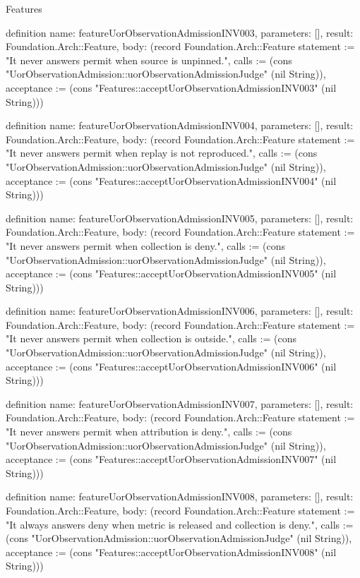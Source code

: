 \begin{lexlean}{Features}
\begin{semanticmodule}
definition{
  name: featureUorObservationAdmissionINV003,
  parameters: [],
  result: Foundation.Arch::Feature,
  body: (record Foundation.Arch::Feature {statement := "It never answers permit when source is unpinned.", calls := (cons "UorObservationAdmission::uorObservationAdmissionJudge" (nil String)), acceptance := (cons "Features::acceptUorObservationAdmissionINV003" (nil String))})
}

definition{
  name: featureUorObservationAdmissionINV004,
  parameters: [],
  result: Foundation.Arch::Feature,
  body: (record Foundation.Arch::Feature {statement := "It never answers permit when replay is not reproduced.", calls := (cons "UorObservationAdmission::uorObservationAdmissionJudge" (nil String)), acceptance := (cons "Features::acceptUorObservationAdmissionINV004" (nil String))})
}

definition{
  name: featureUorObservationAdmissionINV005,
  parameters: [],
  result: Foundation.Arch::Feature,
  body: (record Foundation.Arch::Feature {statement := "It never answers permit when collection is deny.", calls := (cons "UorObservationAdmission::uorObservationAdmissionJudge" (nil String)), acceptance := (cons "Features::acceptUorObservationAdmissionINV005" (nil String))})
}

definition{
  name: featureUorObservationAdmissionINV006,
  parameters: [],
  result: Foundation.Arch::Feature,
  body: (record Foundation.Arch::Feature {statement := "It never answers permit when collection is outside.", calls := (cons "UorObservationAdmission::uorObservationAdmissionJudge" (nil String)), acceptance := (cons "Features::acceptUorObservationAdmissionINV006" (nil String))})
}

definition{
  name: featureUorObservationAdmissionINV007,
  parameters: [],
  result: Foundation.Arch::Feature,
  body: (record Foundation.Arch::Feature {statement := "It never answers permit when attribution is deny.", calls := (cons "UorObservationAdmission::uorObservationAdmissionJudge" (nil String)), acceptance := (cons "Features::acceptUorObservationAdmissionINV007" (nil String))})
}

definition{
  name: featureUorObservationAdmissionINV008,
  parameters: [],
  result: Foundation.Arch::Feature,
  body: (record Foundation.Arch::Feature {statement := "It always answers deny when metric is released and collection is deny.", calls := (cons "UorObservationAdmission::uorObservationAdmissionJudge" (nil String)), acceptance := (cons "Features::acceptUorObservationAdmissionINV008" (nil String))})
}


\end{semanticmodule}
\end{lexlean}
